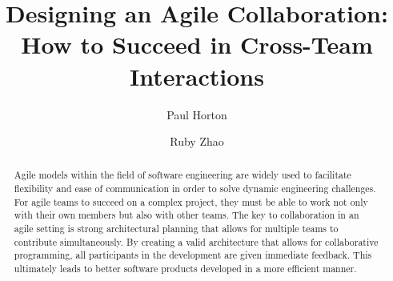 \documentclass[sigplan,screen]{acmart}
\begin{document}
%
\title{Designing an Agile Collaboration: How to Succeed in Cross-Team Interactions}

%
\author{Paul Horton}

\author{Ruby Zhao}

%
\begin{abstract}
Agile models within the field of software engineering are widely used to facilitate flexibility and ease of communication in order to solve dynamic engineering challenges.
For agile teams to succeed on a complex project, they must be able to work not only with their own members but also with other teams.
The key to collaboration in an agile setting is strong architectural planning that allows for multiple teams to contribute simultaneously.
By creating a valid architecture that allows for collaborative programming, all participants in the development are given immediate feedback.
This ultimately leads to better software products developed in a more efficient manner.
\end{abstract}

%

%
\end{document}
